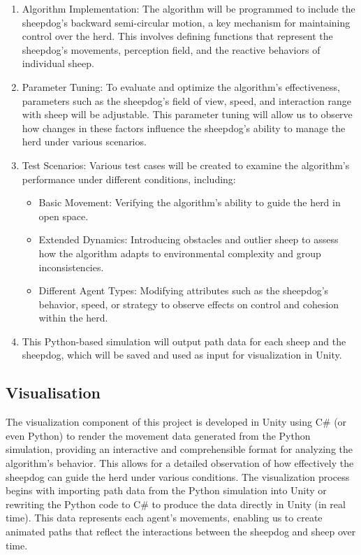 \documentclass[9pt]{pnas-new}
\begin{document}
\begin{enumerate}
    \item Algorithm Implementation: The algorithm will be programmed to include the sheepdog’s backward semi-circular motion, a key mechanism for maintaining control over the herd. This involves defining functions that represent the sheepdog’s movements, perception field, and the reactive behaviors of individual sheep.
    \item Parameter Tuning: To evaluate and optimize the algorithm’s effectiveness, parameters such as the sheepdog’s field of view, speed, and interaction range with sheep will be adjustable. This parameter tuning will allow us to observe how changes in these factors influence the sheepdog’s ability to manage the herd under various scenarios.
    \item Test Scenarios: Various test cases will be created to examine the algorithm’s performance under different conditions, including:
    \begin{itemize}
        \item Basic Movement: Verifying the algorithm’s ability to guide the herd in open space.
        \item Extended Dynamics: Introducing obstacles and outlier sheep to assess how the algorithm adapts to environmental complexity and group inconsistencies.
        \item Different Agent Types: Modifying attributes such as the sheepdog’s behavior, speed, or strategy to observe effects on control and cohesion within the herd.
    \end{itemize}
    \item This Python-based simulation will output path data for each sheep and the sheepdog, which will be saved and used as input for visualization in Unity.
\end{enumerate}

\subsection*{Visualisation}

The visualization component of this project is developed in Unity using C\# (or even Python) to render the movement data generated from the Python simulation, providing an interactive and comprehensible format for analyzing the algorithm's behavior. This allows for a detailed observation of how effectively the sheepdog can guide the herd under various conditions. The visualization process begins with importing path data from the Python simulation into Unity or rewriting the Python code to C# to produce the data directly in Unity (in real time). This data represents each agent's movements, enabling us to create animated paths that reflect the interactions between the sheepdog and sheep over time.
\end{document}
